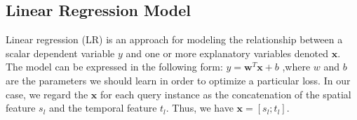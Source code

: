 \subsection{Linear Regression Model}
Linear regression (LR) is an approach for modeling the relationship between a scalar dependent variable $y$ and one or more explanatory variables denoted $\mathbf x$. 
The model can be expressed in the following form:
$y = \mathbf{w}^T \mathbf{x} + b$ ,where $w$ and $b$ are the parameters we should learn in order to optimize a particular loss. 
In our case, we regard the $\mathbf x$ for each query instance as the concatenation of the spatial feature $s_l$ and the temporal feature $t_l$. 
Thus, we have $\mathbf{x} = [s_l;t_l]$.

